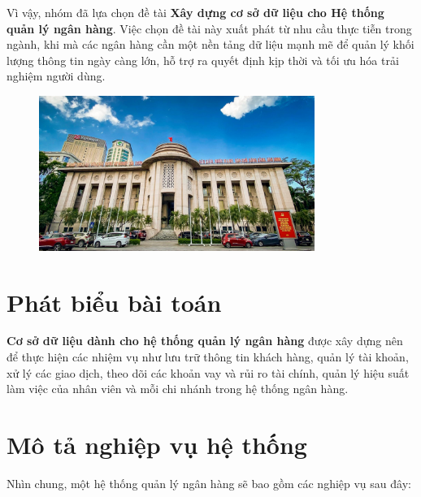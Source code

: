\documentclass[a4paper, 12pt]{report}
\begin{document}
Vì vậy, nhóm đã lựa chọn đề tài \textbf{Xây dựng cơ sở dữ liệu cho Hệ thống quản lý ngân hàng}. 
Việc chọn đề tài này xuất phát từ nhu cầu thực tiễn trong ngành, khi mà các ngân hàng cần một nền tảng dữ liệu mạnh mẽ để quản lý khối lượng thông tin ngày càng lớn, hỗ trợ ra quyết định kịp thời và tối ưu hóa trải nghiệm người dùng. 

\begin{figure}[H]
    \centering
    \includegraphics[width=0.8\textwidth]{CentralBank.png}
\end{figure}


\section{Phát biểu bài toán}

\textbf{Cơ sở dữ liệu dành cho hệ thống quản lý ngân hàng} được xây dựng nên để thực hiện các nhiệm vụ như lưu trữ thông tin khách hàng, quản lý 
tài khoản, xử lý các giao dịch, theo dõi các khoản vay và rủi ro tài chính, quản lý hiệu suất làm việc của nhân viên và mỗi chi nhánh trong hệ thống ngân hàng.


\section{Mô tả nghiệp vụ hệ thống}

Nhìn chung, một hệ thống quản lý ngân hàng sẽ bao gồm các nghiệp vụ sau đây:
\end{document}
